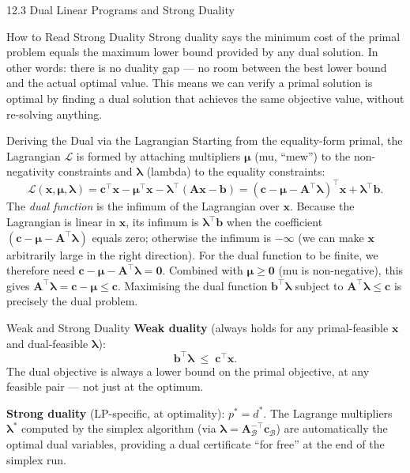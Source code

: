 \documentclass[aspectratio=169,10pt]{beamer}
\newcommand{\xv}{\mathbf{x}}
\newcommand{\cv}{\mathbf{c}}
\newcommand{\bv}{\mathbf{b}}
\newcommand{\Av}{\mathbf{A}}
\newcommand{\muv}{\boldsymbol{\mu}}
\newcommand{\lav}{\boldsymbol{\lambda}}
\newcommand{\calB}{\mathcal{B}}
\begin{document}
\begin{frame}[allowframebreaks]{12.3 Dual Linear Programs and Strong Duality}
\begin{alertblock}{How to Read Strong Duality}
Strong duality says the minimum cost of the primal problem equals the maximum lower
bound provided by any dual solution.  In other words: there is no duality gap ---
no room between the best lower bound and the actual optimal value.  This means we can
verify a primal solution is optimal by finding a dual solution that achieves the same
objective value, without re-solving anything.
\end{alertblock}

\framebreak

\begin{block}{Deriving the Dual via the Lagrangian}
Starting from the equality-form primal, the Lagrangian $\mathcal{L}$ is formed by
attaching multipliers $\muv$ (mu, ``mew'') to the non-negativity constraints and
$\lav$ (lambda) to the equality constraints:
\[
  \mathcal{L}(\xv,\muv,\lav)
  = \cv^\top\xv - \muv^\top\xv - \lav^\top(\Av\xv - \bv)
  = (\cv - \muv - \Av^\top\lav)^\top\xv + \lav^\top\bv.
\]
The \emph{dual function} is the infimum of the Lagrangian over $\xv$.
Because the Lagrangian is linear in $\xv$, its infimum is $\lav^\top\bv$ when
the coefficient $(\cv - \muv - \Av^\top\lav)$ equals zero; otherwise the infimum
is $-\infty$ (we can make $\xv$ arbitrarily large in the right direction).
For the dual function to be finite, we therefore need $\cv - \muv - \Av^\top\lav = \mathbf{0}$.
Combined with $\muv \ge \mathbf{0}$ (mu is non-negative), this gives
$\Av^\top\lav = \cv - \muv \le \cv$.
Maximising the dual function $\bv^\top\lav$ subject to $\Av^\top\lav \le \cv$
is precisely the dual problem.
\end{block}

\begin{block}{Weak and Strong Duality}
\textbf{Weak duality} (always holds for any primal-feasible $\xv$ and dual-feasible $\lav$):
\[
  \bv^\top\lav \;\le\; \cv^\top\xv.
\]
The dual objective is always a lower bound on the primal objective, at any feasible
pair --- not just at the optimum.

\textbf{Strong duality} (LP-specific, at optimality): $p^* = d^*$.
The Lagrange multipliers $\lav^*$ computed by the simplex algorithm
(via $\lav = \Av_\calB^{-\top}\cv_\calB$) are automatically the optimal dual variables,
providing a dual certificate ``for free'' at the end of the simplex run.
\end{block}

\end{frame}
\end{document}
